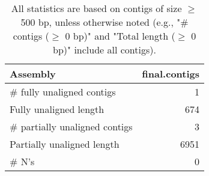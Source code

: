 \documentclass[12pt,a4paper]{article}
\begin{document}
\begin{table}[ht]
\begin{center}
\caption{All statistics are based on contigs of size $\geq$ 500 bp, unless otherwise noted (e.g., "\# contigs ($\geq$ 0 bp)" and "Total length ($\geq$ 0 bp)" include all contigs).}
\begin{tabular}{|l*{1}{|r}|}
\hline
Assembly & final.contigs \\ \hline
\# fully unaligned contigs & 1 \\ \hline
Fully unaligned length & 674 \\ \hline
\# partially unaligned contigs & 3 \\ \hline
Partially unaligned length & 6951 \\ \hline
\# N's & 0 \\ \hline
\end{tabular}
\end{center}
\end{table}
\end{document}
